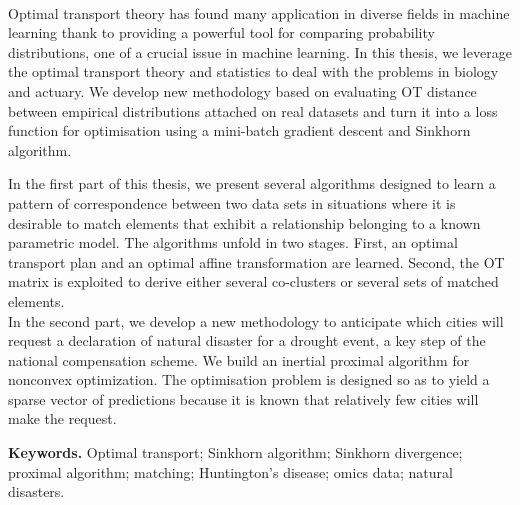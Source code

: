 \\

Optimal transport theory has found many application in diverse fields in machine learning thank to 
providing a powerful tool for comparing probability distributions, one of a crucial issue
in machine learning.  In this thesis, we leverage the optimal transport theory and statistics to deal with 
the problems in biology and actuary. We develop new methodology based on evaluating OT distance
between empirical distributions attached on real datasets and turn it into a loss function for optimisation
using a mini-batch gradient descent and Sinkhorn algorithm.  


In the first part of this thesis, we  present  several  algorithms  designed   to
learn  a  pattern  of correspondence between two data sets in  situations where
it is desirable to match elements that  exhibit a relationship belonging to  a known parametric
model.  The algorithms unfold  in two stages.  First, an  optimal transport plan
and an optimal  affine transformation are learned. Second,  the OT matrix is  exploited to
derive either several co-clusters or several sets of matched elements.\\
In the second part,  we develop a new methodology to anticipate which cities will request
a declaration  of natural disaster  for a drought event,  a key step  of the
national compensation  scheme. We build an  inertial proximal algorithm for  nonconvex optimization.  
The optimisation  problem  is  designed  so  as to  yield  a  sparse  vector  of
predictions because  it is known  that relatively  few cities will  make the
request.

  
  \textbf{Keywords.} Optimal transport; Sinkhorn algorithm; Sinkhorn divergence;
  proximal algorithm; matching; Huntington's disease; omics data; natural disasters.
  
       
  